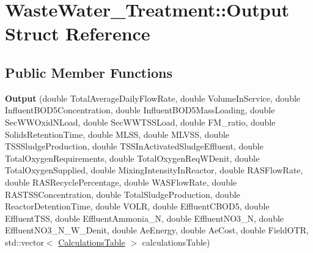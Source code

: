 \hypertarget{struct_waste_water___treatment_1_1_output}{}\section{Waste\+Water\+\_\+\+Treatment\+:\+:Output Struct Reference}
\label{struct_waste_water___treatment_1_1_output}
\subsection*{Public Member Functions}
\begin{DoxyCompactItemize}
\item 
\mbox{\label{struct_waste_water___treatment_1_1_output_aa52bc41b8aa3d144c7d9ef5de40e1468}} 
{\bfseries Output} (double Total\+Average\+Daily\+Flow\+Rate, double Volume\+In\+Service, double Influent\+B\+O\+D5\+Concentration, double Influent\+B\+O\+D5\+Mass\+Loading, double Sec\+W\+W\+Oxid\+N\+Load, double Sec\+W\+W\+T\+S\+S\+Load, double F\+M\+\_\+ratio, double Solids\+Retention\+Time, double M\+L\+SS, double M\+L\+V\+SS, double T\+S\+S\+Sludge\+Production, double T\+S\+S\+In\+Activated\+Sludge\+Effluent, double Total\+Oxygen\+Requirements, double Total\+Oxygen\+Req\+W\+Denit, double Total\+Oxygen\+Supplied, double Mixing\+Intensity\+In\+Reactor, double R\+A\+S\+Flow\+Rate, double R\+A\+S\+Recycle\+Percentage, double W\+A\+S\+Flow\+Rate, double R\+A\+S\+T\+S\+S\+Concentration, double Total\+Sludge\+Production, double Reactor\+Detention\+Time, double V\+O\+LR, double Effluent\+C\+B\+O\+D5, double Effluent\+T\+SS, double Effluent\+Ammonia\+\_\+N, double Effluent\+N\+O3\+\_\+N, double Effluent\+N\+O3\+\_\+\+N\+\_\+\+W\+\_\+\+Denit, double Ae\+Energy, double Ae\+Cost, double Field\+O\+TR, std\+::vector$<$ \hyperlink{struct_waste_water___treatment_1_1_calculations_table}{Calculations\+Table} $>$ calculations\+Table)
\item 
\mbox{\label{struct_waste_water___treatment_1_1_output_aa52bc41b8aa3d144c7d9ef5de40e1468}} 

\end{DoxyCompactItemize}
